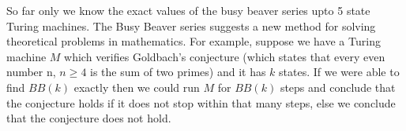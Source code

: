 \documentclass[a4paper]{article}
\begin{document}
So far only we know the exact values of the busy beaver series upto 5 state
Turing machines. The Busy Beaver series suggests a new method for solving
theoretical problems in mathematics. For example, suppose we have a Turing
machine \(M\) which verifies Goldbach's conjecture (which states that every
even number n, \(n \geq 4\) is the sum of two primes) and it has \(k\) states.
If we were able to find \(BB(k)\) exactly then we could run \(M\) for \(BB(k)\)
steps and conclude that the conjecture holds if it does not stop within that
many steps, else we conclude that the conjecture does not hold.

\nocite{*}
\printbibliography
\end{document}
